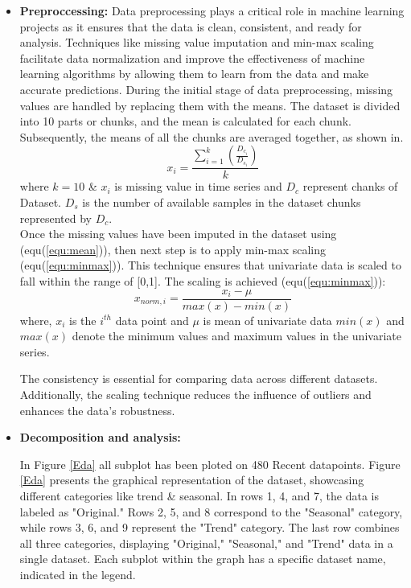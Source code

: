 \documentclass[a4paper,fleqn]{cas-sc}
\begin{document}
\begin{itemize}

\item
\textbf{Preproccessing: }
Data preprocessing plays a critical role in machine learning projects as it ensures that the data is clean, consistent, and ready for analysis. Techniques like missing value imputation and min-max scaling facilitate data normalization and improve the effectiveness of machine learning algorithms by allowing them to learn from the data and make accurate predictions.
During the initial stage of data preprocessing, missing values are handled by replacing them with the means. The dataset is divided into 10 parts or chunks, and the mean is calculated for each chunk. Subsequently, the means of all the chunks are averaged together, as shown in.
\begin{equation} \label{equ:mean}
        x_i=\frac{\sum_{i=1}^{k} \left(\frac{D_{c_{i}}}{D_{s_{i}}} \right)}{k}
\end{equation}
 where $k=10$ \& $x_i$ is missing value in time series and $D_c$ represent chanks of Dataset. $D_s$ is the number of available samples in the dataset chunks represented by $D_c$. \\
Once the missing values have been imputed in the dataset using (equ(\ref{equ:mean})), then next step is to apply min-max scaling (equ(\ref{equ:minmax})). This technique ensures that univariate data is scaled to fall within the range of [0,1]. The scaling is achieved (equ(\ref{equ:minmax})):
\begin{equation}
        x_{norm, i}=\frac{x_i - \mu}{max(x)-min(x)}
        \label{equ:minmax}
    \end{equation}
where, $x_i$ is the $i^{th}$ data point and $\mu$ is mean of univariate data $min(x)$  and $max(x)$ denote the minimum values and maximum values in the univariate series.

The consistency is essential for comparing data across different datasets. Additionally, the scaling technique reduces the influence of outliers and enhances the data's robustness.


\item
\textbf{Decomposition and analysis:}

In Figure \ref{Eda} all subplot has been ploted on 480 Recent datapoints. Figure \ref{Eda} presents the graphical representation of the dataset, showcasing different categories like trend \&  seasonal. In rows 1, 4, and 7, the data is labeled as "Original." Rows 2, 5, and 8 correspond to the "Seasonal" category, while rows 3, 6, and 9 represent the "Trend" category. The last row combines all three categories, displaying "Original," "Seasonal," and "Trend" data in a single dataset. Each subplot within the graph has a specific dataset name, indicated in the legend.


\end{itemize}
\end{document}
